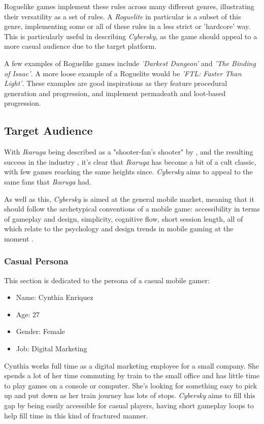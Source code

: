 \documentclass{scrartcl}
\let\cite\textcite
\let\citep\autocite
\begin{document}
Roguelike games implement these rules across many different genres, illustrating their versatility as a set of rules. A \emph{Roguelite} in particular is a subset of this genre, implementing some or all of these rules in a less strict or 'hardcore' way. This is particularly useful in describing \emph{Cybersky}, as the game should appeal to a more casual audience due to the target platform.

A few examples of Roguelike games include \emph{'Darkest Dungeon'} and \emph{'The Binding of Isaac'}. A more loose example of a Roguelite would be \emph{'FTL: Faster Than Light'}. These examples are good inspirations as they feature procedural generation and progression, and implement permadeath and loot-based progression.

\subsection{Target Audience}

With \emph{Ikaruga} being described as a "shooter-fan's shooter" by \cite{Rodriguez2018}, and the resulting success in the industry \citep{BrianW2020-01}, it's clear that \emph{Ikaruga} has become a bit of a cult classic, with few games reaching the same heights since. \emph{Cybersky} aims to appeal to the same fans that \emph{Ikaruga} had.

As well as this, \emph{Cybersky} is aimed at the general mobile market, meaning that it should follow the archetypical conventions of a mobile game: accessibility in terms of gameplay and design, simplicity, cognitive flow, short session length, all of which relate to the psychology and design trends in mobile gaming at the moment \citep{Northington2018}.

\subsubsection{Casual Persona}

This section is dedicated to the persona of a casual mobile gamer:

\begin{itemize}
  \item Name: Cynthia Enriquez
  \item Age: 27
  \item Gender: Female
  \item Job: Digital Marketing
\end{itemize}

Cynthia works full time as a digital marketing employee for a small company. She spends a lot of her time commuting by train to the small office and has little time to play games on a console or computer. She's looking for something easy to pick up and put down as her train journey has lots of stops. \emph{Cybersky} aims to fill this gap by being easily accessible for casual players, having short gameplay loops to help fill time in this kind of fractured manner.
\end{document}
